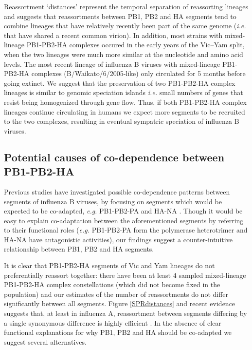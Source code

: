 \documentclass[11pt,oneside,letterpaper]{article}
\begin{document}
Reassortment `distances' represent the temporal separation of reassorting lineages and suggests that reassortments between PB1, PB2 and HA segments tend to combine lineages that have relatively recently been part of the same genome (\textit{i.e.} that have shared a recent common virion).
In addition, most strains with mixed-lineage PB1-PB2-HA complexes occured in the early years of the Vic--Yam split, when the two lineages were much more similar at the nucleotide and amino acid levels.
The most recent lineage of influenza B viruses with mixed-lineage PB1-PB2-HA complexes (B/Waikato/6/2005-like) only circulated for 5 months before going extinct.
We suggest that the preservation of two PB1-PB2-HA complex lineages is similar to genomic speciation islands \textit{i.e.} small numbers of genes that resist being homogenized through gene flow.
Thus, if both PB1-PB2-HA complex lineages continue circulating in humans we expect more segments to be recruited to the two complexes, resulting in eventual sympatric speciation of influenza B viruses. 

\subsection*{Potential causes of co-dependence between PB1-PB2-HA}
Previous studies have investigated possible co-dependence patterns between segments of influenza B viruses, by focusing on segments which would be expected to be co-adapted, \textit{e.g.} PB1-PB2-PA and HA-NA \cite{mccullers2004}.
Though it would be easy to explain co-adaptation between the aforementioned segments by referring to their functional roles (\textit{e.g.} PB1-PB2-PA form the polymerase heterotrimer and HA-NA have antagonistic activities), our findings suggest a counter-intuitive relationship between PB1, PB2 and HA segments.

It is clear that PB1-PB2-HA segments of Vic and Yam lineages do not preferentially reassort together: there have been at least 4 sampled mixed-lineage PB1-PB2-HA complex constellations (which did not become fixed in the population) and our estimates of the number of reassortments do not differ significantly between all segments.
Figure \ref{SPRdistances} and recent evidence suggests that, at least in influenza A, reassortment between segments differing by a single synonymous difference is highly efficient \cite{marshall2013}.
In the absence of clear functional explanations for why PB1, PB2 and HA should be co-adapted we suggest several alternatives.
\end{document}
